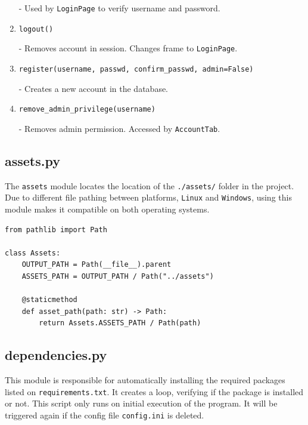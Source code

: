 \documentclass[12pt,a4paper]{article}
\renewcommand{\indent}{\hspace\parindent}
\begin{document}
\begin{enumerate}
                - Used by \texttt{LoginPage} to verify username and password.

            \item[\ding{118}]\texttt{logout()}

                - Removes account in session. Changes frame to \texttt{LoginPage}.

            \item[\ding{118}]\texttt{register(username, passwd, confirm\_passwd, admin=False)}

                - Creates a new account in the database.

            \item[\ding{118}]\texttt{remove\_admin\_privilege(username)}

                - Removes admin permission. Accessed by \texttt{AccountTab}.
            
        \end{enumerate}

        \subsection*{\normalfont{\faCode{}} \textbf{assets.py}}

            \indent The \texttt{assets} module locates the location of the 
            \texttt{./assets/} folder in the project. Due to different file pathing 
            between platforms, \texttt{Linux} and \texttt{Windows}, using this 
            module makes it compatible on both operating systems.

            \begin{lstlisting}
from pathlib import Path

class Assets:
    OUTPUT_PATH = Path(__file__).parent
    ASSETS_PATH = OUTPUT_PATH / Path("../assets")

    @staticmethod
    def asset_path(path: str) -> Path:
        return Assets.ASSETS_PATH / Path(path)
            \end{lstlisting}

        \newpage

        \subsection*{\normalfont{\faCode{}} \textbf{dependencies.py}}

            \indent This module is responsible for automatically installing the 
            required packages listed on \texttt{requirements.txt}. It creates a
            loop, verifying if the package is installed or not. This script 
            only runs on initial execution of the program. It will be triggered 
            again if the config file \texttt{config.ini} is deleted.
\end{document}
